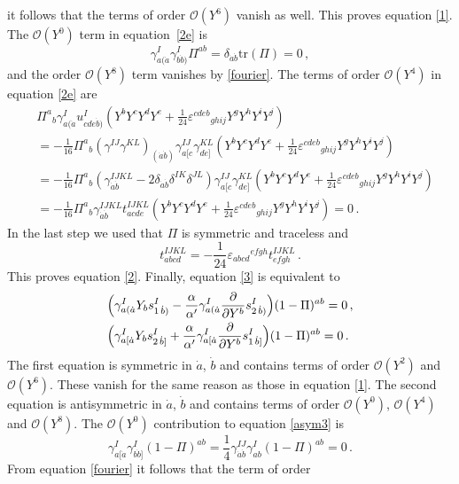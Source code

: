 \documentclass[12pt]{article}
\def\da{\dot{a}}
\def\db{\dot{b}}
\def\a{\alpha}
\def\g{\gamma}
\def\d{\delta}
\def\e{\varepsilon}
\def\tr{\mbox{tr}}
\def\mc{\mathcal}
\def\p{\partial}
\numberwithin{equation}{section} \setlength{\textwidth}{17cm}
\begin{document}
it follows that the terms of order ${\mc O}(Y^6)$ vanish as well.
This proves equation \eqref{1}.
The ${\mc O}(Y^0)$ term in equation~\eqref{2e} is
\begin{equation}
\g^I_{a(\da}\g^I_{b\db)}\Pi^{ab}=\d_{\da\db}\tr(\Pi)=0\,,
\end{equation}
and the order ${\mc O}(Y^8)$ term vanishes by \eqref{fourier}.
The terms of order ${\mc O}(Y^4)$ in equation \eqref{2e} are
\begin{align}
&{\Pi^a}_b\g^I_{a(\da}u^I_{cde\db)}
\left(Y^bY^cY^dY^e+\frac{1}{24}{\e^{cdeb}}_{ghij}Y^gY^hY^iY^j\right)\nonumber 
\\
&=-\frac{1}{16}{\Pi^a}_b\left(\g^{IJ}\g^{KL}\right)_{(\dot{a}\dot{b})}
\g^{IJ}_{a[c}\g^{KL}_{de]}\left(Y^bY^cY^dY^e+\frac{1}{24}{\e^{cdeb}}_{ghij}
Y^gY^hY^iY^j\right)
\nonumber\\
&=-\frac{1}{16}{\Pi^a}_b\left(\g^{IJKL}_{\da\db}-2\d_{\da\db}\d^{IK}\d^{JL}\right)
\g^{IJ}_{a[c}\g^{KL}_{de]}\left(Y^bY^cY^dY^e+\frac{1}{24}{\e^{cdeb}}_{ghij}
Y^gY^hY^iY^j\right)
\nonumber\\
&=-\frac{1}{16}{\Pi^a}_b\g^{IJKL}_{\da\db}t^{IJKL}_{acde}
\left(Y^bY^cY^dY^e+\frac{1}{24}{\e^{cdeb}}_{ghij}Y^gY^hY^iY^j\right)=0\,.
\end{align}
In the last step we used that $\Pi$ is symmetric and traceless and
\begin{equation}
t^{IJKL}_{abcd}=-\frac{1}{24}{\e_{abcd}}^{efgh}t^{IJKL}_{efgh}\,.
\end{equation}
This proves equation \eqref{2}. Finally, equation \eqref{3} is
equivalent to
\begin{align}
\label{sym3} &
\Bigl(\g^I_{a(\da}Y_bs_{1\,\db)}^I-\frac{\a}{\a'}\g^I_{a(\da}\frac{\p}{\p
Y^b}s_{2\,\db)}^I
\Bigr)(1-\Pi)^{ab}=0\,,\\
\label{asym3} &
\Bigl(\g^I_{a[\da}Y_bs_{2\,\db]}^I+\frac{\a}{\a'}\g^I_{a[\da}\frac{\p}{\p
Y^b}s_{1\,\db]}^I \Bigr)(1-\Pi)^{ab}=0\,.
\end{align}
The first equation is symmetric in $\da$, $\db$ and contains terms
of order ${\mc O}(Y^2)$ and ${\mc O}(Y^6)$. These vanish for the
same reason as those in equation \eqref{1}. The second equation is
antisymmetric in $\da$, $\db$ and contains terms of order ${\mc O}(Y^0)$, ${\mc O}(Y^4)$
and ${\mc O}(Y^8)$.
The ${\mc O}(Y^0)$ contribution to equation \eqref{asym3} is
\begin{equation}
\g^I_{a[\da}\g^I_{b\db]}(1-\Pi)^{ab}=\frac{1}{4}\g^{IJ}_{\da\db}\g^I_{ab}(1-\Pi)^{ab}=0\,.
\end{equation}
From equation \eqref{fourier} it follows that the term of order
\end{document}
